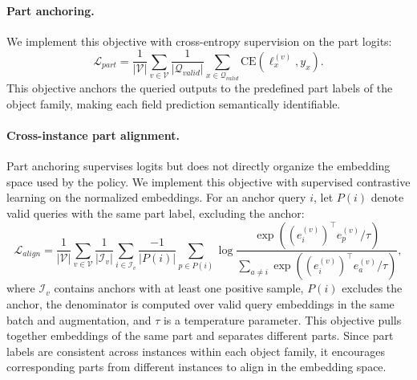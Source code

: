   \paragraph{Part anchoring.}
  We implement this objective with cross-entropy supervision on the part logits:
  \begin{equation}
      \mathcal{L}_{part}
      =
      \frac{1}{|\mathcal{V}|}
      \sum_{v \in \mathcal{V}}
      \frac{1}{|\mathcal{Q}_{valid}|}
      \sum_{x \in \mathcal{Q}_{valid}}
      \mathrm{CE}(\ell_x^{(v)}, y_x).
  \end{equation}
  This objective anchors the queried outputs to the predefined part labels of the object family, making each field prediction semantically identifiable.

  \paragraph{Cross-instance part alignment.}
  Part anchoring supervises logits but does not directly organize the embedding space used by the policy. We implement this objective with supervised contrastive
  learning on the normalized embeddings. For an anchor query $i$, let $P(i)$ denote valid queries with the same part label, excluding the anchor:
  \begin{equation}
      \mathcal{L}_{align}
      =
      \frac{1}{|\mathcal{V}|}
      \sum_{v \in \mathcal{V}}
      \frac{1}{|\mathcal{I}_v|}
      \sum_{i \in \mathcal{I}_v}
      \frac{-1}{|P(i)|}
      \sum_{p \in P(i)}
      \log
      \frac{
          \exp((e_i^{(v)})^\top e_p^{(v)} / \tau)
      }{
          \sum_{a \neq i}
          \exp((e_i^{(v)})^\top e_a^{(v)} / \tau)
      },
  \end{equation}
  where $\mathcal{I}_v$ contains anchors with at least one positive sample, $P(i)$ excludes the anchor, the denominator is computed over valid query embeddings in the same batch and augmentation, and $\tau$ is a temperature parameter. This objective pulls together embeddings of the
  same part and separates different parts. Since part labels are consistent across instances within each object family, it encourages corresponding parts from
  different instances to align in the embedding space.


